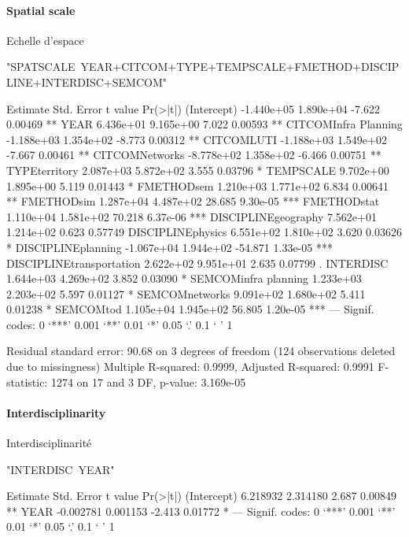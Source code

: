 \paragraph{Spatial scale}{Echelle d'espace}


"SPATSCALE~YEAR+CITCOM+TYPE+TEMPSCALE+FMETHOD+DISCIPLINE+INTERDISC+SEMCOM"

                           Estimate Std. Error t value Pr(>|t|)    
(Intercept)              -1.440e+05  1.890e+04  -7.622  0.00469 ** 
YEAR                      6.436e+01  9.165e+00   7.022  0.00593 ** 
CITCOMInfra Planning     -1.188e+03  1.354e+02  -8.773  0.00312 ** 
CITCOMLUTI               -1.188e+03  1.549e+02  -7.667  0.00461 ** 
CITCOMNetworks           -8.778e+02  1.358e+02  -6.466  0.00751 ** 
TYPEterritory             2.087e+03  5.872e+02   3.555  0.03796 *  
TEMPSCALE                 9.702e+00  1.895e+00   5.119  0.01443 *  
FMETHODsem                1.210e+03  1.771e+02   6.834  0.00641 ** 
FMETHODsim                1.287e+04  4.487e+02  28.685 9.30e-05 ***
FMETHODstat               1.110e+04  1.581e+02  70.218 6.37e-06 ***
DISCIPLINEgeography       7.562e+01  1.214e+02   0.623  0.57749    
DISCIPLINEphysics         6.551e+02  1.810e+02   3.620  0.03626 *  
DISCIPLINEplanning       -1.067e+04  1.944e+02 -54.871 1.33e-05 ***
DISCIPLINEtransportation  2.622e+02  9.951e+01   2.635  0.07799 .  
INTERDISC                 1.644e+03  4.269e+02   3.852  0.03090 *  
SEMCOMinfra planning      1.233e+03  2.203e+02   5.597  0.01127 *  
SEMCOMnetworks            9.091e+02  1.680e+02   5.411  0.01238 *  
SEMCOMtod                 1.105e+04  1.945e+02  56.805 1.20e-05 ***
---
Signif. codes:  0 ‘***’ 0.001 ‘**’ 0.01 ‘*’ 0.05 ‘.’ 0.1 ‘ ’ 1

Residual standard error: 90.68 on 3 degrees of freedom
  (124 observations deleted due to missingness)
Multiple R-squared:  0.9999,	Adjusted R-squared:  0.9991 
F-statistic:  1274 on 17 and 3 DF,  p-value: 3.169e-05




\paragraph{Interdisciplinarity}{Interdisciplinarité}


"INTERDISC~YEAR"

             Estimate Std. Error t value Pr(>|t|)   
(Intercept)  6.218932   2.314180   2.687  0.00849 **
YEAR        -0.002781   0.001153  -2.413  0.01772 * 
---
Signif. codes:  0 ‘***’ 0.001 ‘**’ 0.01 ‘*’ 0.05 ‘.’ 0.1 ‘ ’ 1

